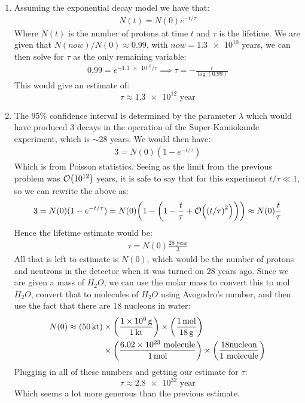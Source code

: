 \documentclass[12pt]{article}
\begin{document}
\begin{enumerate}[label = (\alph*)]
\item Assuming the exponential decay model we have that:
  \begin{align*}
    N(t)=N(0)e^{-t/\tau}
  \end{align*}
  Where $N(t)$ is the number of protons at time $t$ and $\tau$ is the lifetime. We are given that $N(now)/N(0)\approx0.99$, with $now=\num{1.3e10}$ years, we can then solve for $\tau$ as the only remaining variable:
  \begin{align*}
    0.99=e^{-\num{1.3e10}/\tau}\implies\tau=-\frac{t}{\log(0.99)}
  \end{align*}
  This would give an estimate of:
  \begin{equation}
    \label{eq:p9a}
    \boxed{\tau\approx \num{1.3e12}\text{ year}}
  \end{equation}
\item The 95\% confidence interval is determined by the parameter $\lambda$ which would have produced 3 decays in the operation of the Super-Kamiokande experiment, which is $\sim28$ years. We would then have:
  \begin{align*}
    3=N(0)(1-e^{-t/\tau})
  \end{align*}
  Which is from Poisson statistics. Seeing as the limit from the previous problem was $\order{10^{12}}$ years, it is safe to say that for this experiment $t/\tau\ll1$, so we can rewrite the above as:
  \begin{align*}
    3=N(0)(1-e^{-t/\tau})=N(0)\qty(1-\qty(1-\frac{t}\tau+\order{{(t/\tau)}^2}))
    \approx N(0)\frac{t}\tau
  \end{align*}
  Hence the lifetime estimate would be:
  \begin{align*}
    \tau=N(0)\frac{28\text{ year}}{3}
  \end{align*}
  All that is left to estimate is $N(0)$, which would be the number of protons and neutrons in the detector when it was turned on 28 years ago. Since we are given a mass of $H_2O$, we can use the molar mass to convert this to mol $H_2O$, convert that to molecules of $H_2O$ using Avogodro's number, and then use the fact that there are 18 nucleons in water:
  \begin{align*}
    N(0)\approx(\SI{50}{\kilo\tonne})
    &\times\qty(\frac{\SI{1e6}{g}}{\SI{1}{\kilo\tonne}})
    \times\qty(\frac{\SI{1}{mol}}{\SI{18}{g}})\\
    &\times\qty(\frac{6.02\times10^{23}\text{ molecule}}{\SI{1}{mol}})
    \times\qty(\frac{18 \text{nucleon}}{1\text{ molecule}})
  \end{align*}
  Plugging in all of these numbers and getting our estimate for $\tau$:
  \begin{equation}
    \label{eq:p9b}
    \boxed{\tau\approx\num{2.8e32}\text{ year}}
  \end{equation}
  Which seems a lot more generous than the previous estimate.
\end{enumerate}
\end{document}
